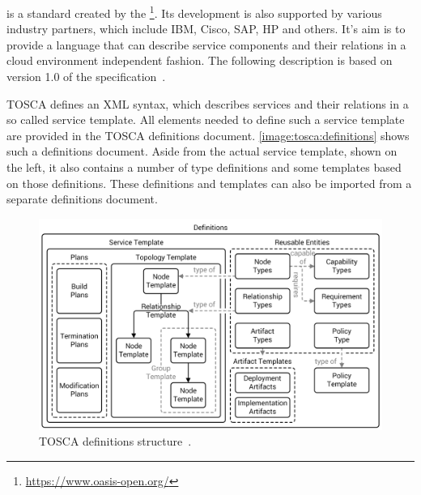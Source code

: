  is a standard created by the \footnote{\url{https://www.oasis-open.org/}}.
Its development is also supported by various industry partners, which include IBM, Cisco, SAP, HP and others.
It's aim is to provide a language that can describe service components and their relations in a cloud environment independent fashion.
The following description is based on version 1.0 of the specification~\autocite{tosca:spec}.

TOSCA defines an XML syntax, which describes services and their relations in a so called service template.
All elements needed to define such a service template are provided in the TOSCA definitions document.
\autoref{image:tosca:definitions} shows such a definitions document.
Aside from the actual service template, shown on the left, it also contains a number of type definitions and some templates based on those definitions.
These definitions and templates can also be imported from a separate definitions document.

\begin{figure}[!htbp]
	\centering
	\includegraphics[resolution=600]{fundamentals/assets/definitions}
	\caption{TOSCA definitions structure~\autocite[based on][]{tosca:spec}.}
	\label{image:tosca:definitions}
\end{figure}

